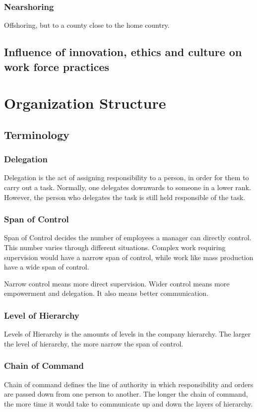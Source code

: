 \documentclass{standalone}
\begin{document}
\subsubsection{Nearshoring}
Offshoring, but to a county close to the home country.

\subsection{Influence of innovation, ethics and culture on work force practices}

\section{Organization Structure}

\subsection{Terminology}
\subsubsection{Delegation}
Delegation is the act of assigning responsibility to a person, in order for them to carry out a task.
Normally, one delegates downwards to someone in a lower rank.
However, the person who delegates the task is still held responsible of the task.

\subsubsection{Span of Control}
Span of Control decides the number of employees a manager can directly control.
This number varies through different situations.
Complex work requiring supervision would have a narrow span of control, while work like mass production have a wide span of control.

Narrow control means more direct supervision.
Wider control means more empowerment and delegation.
It also means better communication.

\subsubsection{Level of Hierarchy}
Levels of Hierarchy is the amounts of levels in the company hierarchy.
The larger the level of hierarchy, the more narrow the span of control.

\subsubsection{Chain of Command}
Chain of command defines the line of authority in which responsibility and orders are passed down from one person to another.
The longer the chain of command, the more time it would take to communicate up and down the layers of hierarchy.
\end{document}
